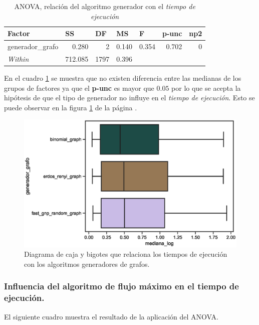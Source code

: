 \documentclass{article}
\begin{document}
\begin{table}[htbp]
  \centering
  \caption{ANOVA, relación del algoritmo generador con el \textit{tiempo de ejecución}}
    \begin{tabular}{lrrrlll}
    \toprule
    \textbf{Factor} & \multicolumn{1}{l}{\textbf{SS}} & \multicolumn{1}{l}{\textbf{DF}} & \multicolumn{1}{l}{\textbf{MS}} & \textbf{F} & \textbf{p-unc} & \textbf{np2} \\
    \midrule
    generador\_grafo & 0.280 & 2     & 0.140 & \multicolumn{1}{r}{0.354} & \multicolumn{1}{r}{0.702} & \multicolumn{1}{r}{0} \\
    \textit{Within} & 712.085 & 1797  & 0.396 &      &      & \\
    \bottomrule
    \end{tabular}%
  \label{tab:t2}%
\end{table}%
En el cuadro \ref{tab:t2} se muestra que no existen diferencia entre las medianas de los grupos de factores ya que el \textbf{p-unc} es mayor que $0.05$ por lo que se acepta la hipótesis de que el tipo de generador no influye en el \textit{tiempo de ejecución}. Esto se puede observar en la figura \ref{fig4} de la página \pageref{fig4}. 

\newpage
\begin{center}
\begin{figure}[htbp]
\includegraphics[scale=0.6]{boxplotgeneradorgrafo.eps}
\caption{Diagrama de caja y bigotes que relaciona los tiempos de ejecución con los algoritmos generadores de grafos.}
\label{fig4}
\end{figure}
\end{center}
\subsubsection{Influencia del algoritmo de flujo máximo en el tiempo de ejecución.}
El siguiente cuadro muestra el resultado de la aplicación del ANOVA.
\end{document}
